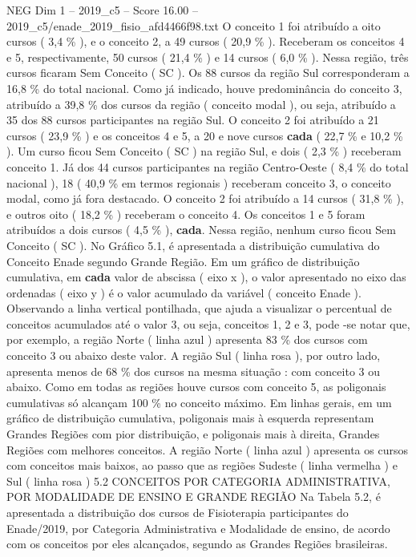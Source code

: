 \begin{textsample}{NEG Dim 1 – 2019\_c5 – Score 16.00 – 2019\_c5/enade\_2019\_fisio\_afd4466f98.txt}
O conceito 1 foi atribuído a oito cursos ( 3,4 \% ), e o conceito 2, a 49 cursos ( 20,9 \% ).
Receberam os conceitos 4 e 5, respectivamente, 50 cursos ( 21,4 \% ) e 14 cursos ( 6,0 \% ).
Nessa região, três cursos ficaram Sem Conceito ( SC ).
Os 88 cursos da região Sul corresponderam a 16,8 \% do total nacional.
Como já indicado, houve predominância do conceito 3, atribuído a 39,8 \% dos cursos da região ( conceito modal ), ou seja, atribuído a 35 dos 88 cursos participantes na região Sul.
O conceito 2 foi atribuído a 21 cursos ( 23,9 \% ) e os conceitos 4 e 5, a 20 e nove cursos \textbf{cada} ( 22,7 \% e 10,2 \% ).
Um curso ficou Sem Conceito ( SC ) na região Sul, e dois ( 2,3 \% ) receberam conceito 1.
Já dos 44 cursos participantes na região Centro-Oeste ( 8,4 \% do total nacional ), 18 ( 40,9 \% em termos regionais ) receberam conceito 3, o conceito modal, como já fora destacado.
O conceito 2 foi atribuído a 14 cursos ( 31,8 \% ), e outros oito ( 18,2 \% ) receberam o conceito 4.
Os conceitos 1 e 5 foram atribuídos a dois cursos ( 4,5 \% ), \textbf{cada}.
Nessa região, nenhum curso ficou Sem Conceito ( SC ).
No Gráfico 5.1, é apresentada a distribuição cumulativa do Conceito Enade segundo Grande Região.
Em um gráfico de distribuição cumulativa, em \textbf{cada} valor de abscissa ( eixo x ), o valor apresentado no eixo das ordenadas ( eixo y ) é o valor acumulado da variável ( conceito Enade ).
Observando a linha vertical pontilhada, que ajuda a visualizar o percentual de conceitos acumulados até o valor 3, ou seja, conceitos 1, 2 e 3, pode -se notar que, por exemplo, a região Norte ( linha azul ) apresenta 83 \% dos cursos com conceito 3 ou abaixo deste valor.
A região Sul ( linha rosa ), por outro lado, apresenta menos de 68 \% dos cursos na mesma situação : com conceito 3 ou abaixo.
Como em todas as regiões houve cursos com conceito 5, as poligonais cumulativas só alcançam 100 \% no conceito máximo.
Em linhas gerais, em um gráfico de distribuição cumulativa, poligonais mais à esquerda representam Grandes Regiões com pior distribuição, e poligonais mais à direita, Grandes Regiões com melhores conceitos.
A região Norte ( linha azul ) apresenta os cursos com conceitos mais baixos, ao passo que as regiões Sudeste ( linha vermelha ) e Sul ( linha rosa ) 5.2 CONCEITOS POR CATEGORIA ADMINISTRATIVA, POR MODALIDADE DE ENSINO E GRANDE REGIÃO Na Tabela 5.2, é apresentada a distribuição dos cursos de Fisioterapia participantes do Enade/2019, por Categoria Administrativa e Modalidade de ensino, de acordo com os conceitos por eles alcançados, segundo as Grandes Regiões brasileiras.

\end{textsample}
